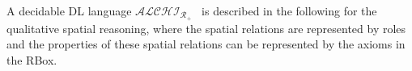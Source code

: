 \documentclass{article}
\newtheorem{mydef}{Definition}
\begin{document}
A decidable DL language $\mathcal{ALCHI_{R_+}}$~\cite{horrocks1999description} is described in the following for the qualitative spatial reasoning, where the spatial relations are 
represented by roles and the properties of these spatial relations can be represented by the axioms in the RBox.
% 
% 
\end{document}
